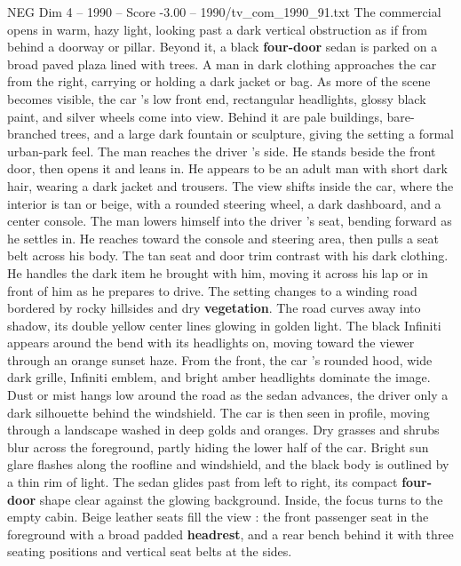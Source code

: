 \begin{textsample}{NEG Dim 4 – 1990 – Score -3.00 – 1990/tv\_com\_1990\_91.txt}  \label{ex:f4_neg_021}
The commercial opens in warm, hazy light, looking past a dark vertical obstruction as if from behind a doorway or pillar.
Beyond it, a black \textbf{four-door} sedan is parked on a broad paved plaza lined with trees.
A man in dark clothing approaches the car from the right, carrying or holding a dark jacket or bag.
As more of the scene becomes visible, the car ’s low front end, rectangular headlights, glossy black paint, and silver wheels come into view.
Behind it are pale buildings, bare-branched trees, and a large dark fountain or sculpture, giving the setting a formal urban-park feel.
The man reaches the driver ’s side.
He stands beside the front door, then opens it and leans in.
He appears to be an adult man with short dark hair, wearing a dark jacket and trousers.
The view shifts inside the car, where the interior is tan or beige, with a rounded steering wheel, a dark dashboard, and a center console.
The man lowers himself into the driver ’s seat, bending forward as he settles in.
He reaches toward the console and steering area, then pulls a seat belt across his body.
The tan seat and door trim contrast with his dark clothing.
He handles the dark item he brought with him, moving it across his lap or in front of him as he prepares to drive.
The setting changes to a winding road bordered by rocky hillsides and dry \textbf{vegetation}.
The road curves away into shadow, its double yellow center lines glowing in golden light.
The black Infiniti appears around the bend with its headlights on, moving toward the viewer through an orange sunset haze.
From the front, the car ’s rounded hood, wide dark grille, Infiniti emblem, and bright amber headlights dominate the image.
Dust or mist hangs low around the road as the sedan advances, the driver only a dark silhouette behind the windshield.
The car is then seen in profile, moving through a landscape washed in deep golds and oranges.
Dry grasses and shrubs blur across the foreground, partly hiding the lower half of the car.
Bright sun glare flashes along the roofline and windshield, and the black body is outlined by a thin rim of light.
The sedan glides past from left to right, its compact \textbf{four-door} shape clear against the glowing background.
Inside, the focus turns to the empty cabin.
Beige leather seats fill the view : the front passenger seat in the foreground with a broad padded \textbf{headrest}, and a rear bench behind it with three seating positions and vertical seat belts at the sides.

\end{textsample}
